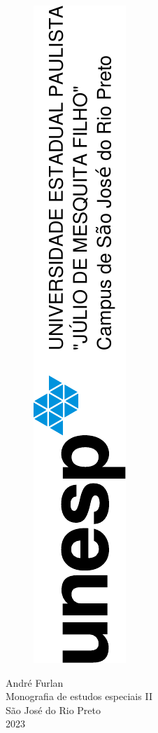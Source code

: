 \documentclass[a4paper,12pt,openright,oneside]{book}
\begin{document}
	\thispagestyle{empty}
	\begin{center}
		\par \null
		\begin{figure}[H]
			\centering \includegraphics[angle=-90]{unesp.pdf}
		\end{figure} 
		\vspace{3cm}
		\fontsize{14}{\baselineskip} \selectfont
		{André Furlan} \\  
		\vspace{4.5cm}
		\onehalfspacing
		\fontsize{14}{\baselineskip} \selectfont
		Monografia de estudos especiais II \\
		\vspace{7cm}
		\fontsize{14}{\baselineskip} \selectfont  
		{São José do Rio Preto}\\ \vspace{1.0pt} 
		{2023} 
	\end{center}
\end{document}
